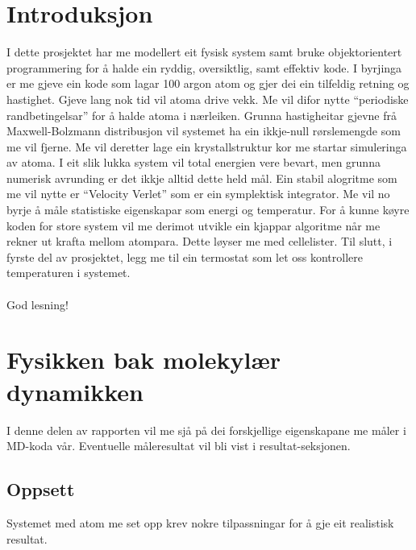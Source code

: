 \documentclass[12pt, a4paper]{article}
\theoremstyle{definition} \newtheorem*{definition}{Teorem}
\begin{document}
\newpage
    \tableofcontents
\newpage

\section*{Introduksjon}

    I dette prosjektet har me modellert eit fysisk system samt bruke objektorientert programmering for å halde ein ryddig, oversiktlig, samt effektiv kode. 
    I byrjinga er me gjeve ein kode som lagar 100 argon atom og gjer dei ein tilfeldig retning og hastighet. Gjeve lang nok tid vil atoma drive vekk. Me vil difor nytte
    ``periodiske randbetingelsar'' for å halde atoma i nærleiken. Grunna hastigheitar gjevne frå Maxwell-Bolzmann distribusjon vil systemet ha ein ikkje-null
    rørslemengde som me vil fjerne. Me vil deretter lage ein krystallstruktur kor me startar simuleringa av atoma. I eit slik lukka system vil total energien vere bevart, 
    men grunna numerisk avrunding er det ikkje alltid dette held mål. Ein stabil alogritme som me vil nytte er ``Velocity Verlet'' som er ein symplektisk integrator. %
    Me vil no byrje å måle statistiske eigenskapar som energi og temperatur. For å kunne køyre koden for store system vil me derimot utvikle ein kjappar algoritme når 
    me rekner ut krafta mellom atompara. Dette løyser me med cellelister. Til slutt, i fyrste del av prosjektet, legg me til ein termostat som let oss kontrollere 
    temperaturen i systemet. \\ \\
    God lesning!



\newpage


\section*{Fysikken bak molekylær dynamikken}
    I denne delen av rapporten vil me sjå på dei forskjellige eigenskapane me måler i MD-koda vår. Eventuelle måleresultat vil bli vist i resultat-seksjonen.

    \subsection*{Oppsett}
        Systemet med atom me set opp krev nokre tilpassningar for å gje eit realistisk resultat. 
\end{document}
